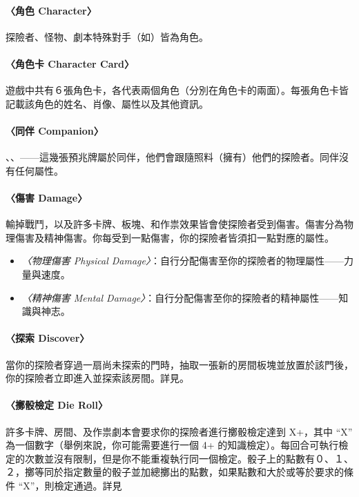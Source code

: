 \paragraph{〈角色 Character〉}
探險者、怪物、劇本特殊對手（如）皆為角色。

\paragraph{〈角色卡 Character Card〉}
遊戲中共有６張角色卡，各代表兩個角色（分別在角色卡的兩面）。每張角色卡皆記載該角色的姓名、肖像、屬性以及其他資訊。

\paragraph{〈同伴 Companion〉}
、、——這幾張預兆牌屬於同伴，他們會跟隨照料（擁有）他們的探險者。同伴沒有任何屬性。

\paragraph{〈傷害 Damage〉}

輸掉戰鬥，以及許多卡牌、板塊、和作祟效果皆會使探險者受到傷害。傷害分為物理傷害及精神傷害。你每受到一點傷害，你的探險者皆須扣一點對應的屬性。

\begin{itemize}
  \item \textit{〈物理傷害 Physical Damage〉}：自行分配傷害至你的探險者的物理屬性——力量與速度。
  \item \textit{〈精神傷害 Mental Damage〉}：自行分配傷害至你的探險者的精神屬性——知識與神志。
\end{itemize}

\paragraph{〈探索 Discover〉}
當你的探險者穿過一扇尚未探索的門時，抽取一張新的房間板塊並放置於該門後，你的探險者立即進入並探索該房間。詳見。

\paragraph{〈擲骰檢定 Die Roll〉}
許多卡牌、房間、及作祟劇本會要求你的探險者進行擲骰檢定達到 X+，其中 “X” 為一個數字（舉例來說，你可能需要進行一個 4+ 的知識檢定）。每回合可執行檢定的次數並沒有限制，但是你不能重複執行同一個檢定。骰子上的點數有０、１、２，擲等同於指定數量的骰子並加總擲出的點數，如果點數和大於或等於要求的條件 “X”，則檢定通過。詳見 

